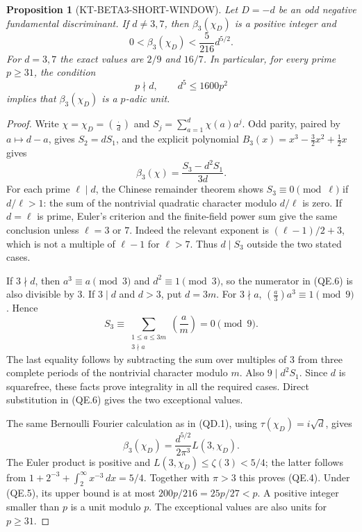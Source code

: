 \documentclass[11pt,a4paper]{article}
\newtheorem{proposition}[theorem]{Proposition}
\theoremstyle{definition}
\begin{document}
\begin{proposition}[KT-BETA3-SHORT-WINDOW]
Let $D=-d$ be an odd negative fundamental discriminant.
If $d\ne3,7$, then $\beta_3(\chi_D)$ is a positive integer and
\[
 0<\beta_3(\chi_D)<\frac{5}{216}d^{5/2}.
 \tag{QE.4}
\]
For $d=3,7$ the exact values are $2/9$ and $16/7$.
In particular, for every prime $p\geq31$, the condition
\[
 p\nmid d,\qquad d^5\leq1600p^2
 \tag{QE.5}
\]
implies that $\beta_3(\chi_D)$ is a $p$-adic unit.
\end{proposition}

\begin{proof}
Write $\chi=\chi_D=(\frac{\cdot}{d})$ and
$S_j=\sum_{a=1}^d\chi(a)a^j$.  Odd parity, paired by $a\mapsto d-a$,
gives $S_2=dS_1$, and the explicit polynomial
$B_3(x)=x^3-\frac32x^2+\frac12x$ gives
\[
 \beta_3(\chi)=\frac{S_3-d^2S_1}{3d}.
 \tag{QE.6}
\]
For each prime $\ell\mid d$, the Chinese remainder theorem shows
$S_3\equiv0\pmod\ell$ if $d/\ell>1$: the sum of the nontrivial
quadratic character modulo $d/\ell$ is zero.  If $d=\ell$ is prime,
Euler's criterion and the finite-field power sum give the same
conclusion unless $\ell=3$ or $7$.  Indeed the relevant exponent
is $(\ell-1)/2+3$, which is not a multiple of $\ell-1$ for
$\ell>7$.  Thus $d\mid S_3$ outside the two stated cases.

If $3\nmid d$, then $a^3\equiv a\pmod3$ and $d^2\equiv1\pmod3$,
so the numerator in (QE.6) is also divisible by $3$.
If $3\mid d$ and $d>3$, put $d=3m$.  For $3\nmid a$,
$(\frac a3)a^3\equiv1\pmod9$.  Hence
\[
 S_3\equiv
 \sum_{\substack{1\leq a\leq3m\\3\nmid a}}
          \left(\frac a m\right)=0\pmod9.
\]
The last equality follows by subtracting the sum over multiples
of $3$ from three complete periods of the nontrivial character
modulo $m$.  Also $9\mid d^2S_1$.  Since $d$ is squarefree, these
facts prove integrality in all the required cases.
Direct substitution in (QE.6) gives the two exceptional values.

The same Bernoulli Fourier calculation as in (QD.1), using
$\tau(\chi_D)=i\sqrt d$, gives
\[
 \beta_3(\chi_D)=\frac{d^{5/2}}{2\pi^3}L(3,\chi_D).
\]
The Euler product is positive and
$L(3,\chi_D)\leq\zeta(3)<5/4$; the latter follows from
$1+2^{-3}+\int_2^\infty x^{-3}\,dx=5/4$.
Together with $\pi>3$ this proves (QE.4).
Under (QE.5), its upper bound is at most
$200p/216=25p/27<p$.  A positive integer smaller than $p$
is a unit modulo $p$.  The exceptional values are also units
for $p\geq31$.
\end{proof}
\end{document}
